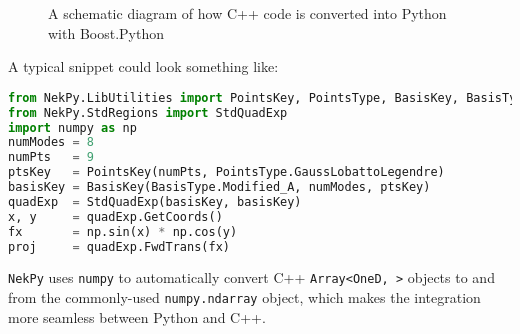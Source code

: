 \begin{figure}[h!]
  \centering
  \caption{A schematic diagram of how C++ code is converted into Python with
    Boost.Python \cite{C++Api}}
  \label{fig:boost_python}
\end{figure}

A typical snippet could look something like:

\begin{lstlisting}[caption={NekPy sample snippet}, label={lst:nekpy_sample}, language=Python]
from NekPy.LibUtilities import PointsKey, PointsType, BasisKey, BasisType
from NekPy.StdRegions import StdQuadExp
import numpy as np
numModes = 8
numPts   = 9
ptsKey   = PointsKey(numPts, PointsType.GaussLobattoLegendre)
basisKey = BasisKey(BasisType.Modified_A, numModes, ptsKey)
quadExp  = StdQuadExp(basisKey, basisKey)
x, y     = quadExp.GetCoords()
fx       = np.sin(x) * np.cos(y)
proj     = quadExp.FwdTrans(fx)
\end{lstlisting}

\texttt{NekPy} uses \texttt{numpy} to automatically convert C++ \texttt{Array<OneD,
  >} objects to and from the commonly-used \texttt{numpy.ndarray} object, which
makes the integration more seamless between Python and C++.
